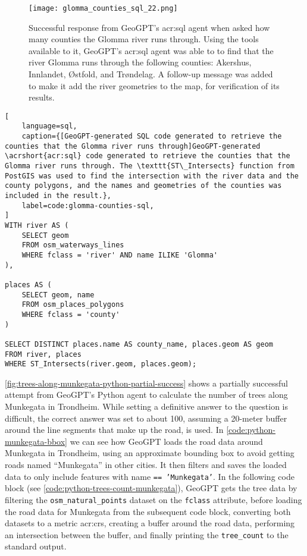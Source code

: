 \begin{figure}[htbp]
    \centering
    \texttt{[image: glomma\_counties\_sql\_22.png]}
    \caption[Successful response from GeoGPT's SQL agent when asked how many counties the Glomma river runs through]{Successful response from GeoGPT's \acrshort{acr:sql} agent when asked how many counties the Glomma river runs through. Using the tools available to it, GeoGPT's \acrshort{acr:sql} agent was able to to find that the river Glomma runs through the following counties: Akershus, Innlandet, Østfold, and Trøndelag. A follow-up message was added to make it add the river geometries to the map, for verification of its results.}
    \label{fig:glomma-counties-sql-successful}
\end{figure}

\FloatBarrier

\begin{lstlisting}[
    language=sql,
    caption={[GeoGPT-generated SQL code generated to retrieve the counties that the Glomma river runs through]GeoGPT-generated \acrshort{acr:sql} code generated to retrieve the counties that the Glomma river runs through. The \texttt{ST\_Intersects} function from PostGIS was used to find the intersection with the river data and the county polygons, and the names and geometries of the counties was included in the result.},
    label=code:glomma-counties-sql,
]
WITH river AS (
    SELECT geom 
    FROM osm_waterways_lines 
    WHERE fclass = 'river' AND name ILIKE 'Glomma'
),

places AS (
    SELECT geom, name 
    FROM osm_places_polygons 
    WHERE fclass = 'county'
)

SELECT DISTINCT places.name AS county_name, places.geom AS geom
FROM river, places
WHERE ST_Intersects(river.geom, places.geom);    
\end{lstlisting}

\FloatBarrier

\autoref{fig:trees-along-munkegata-python-partial-success} shows a partially successful attempt from GeoGPT's Python agent to calculate the number of trees along Munkegata in Trondheim. While setting a definitive answer to the question is difficult, the correct answer was set to about 100, assuming a 20-meter buffer around the line segments that make up the road, is used. In \autoref{code:python-munkegata-bbox} we can see how GeoGPT loads the road data around Munkegata in Trondheim, using an approximate bounding box to avoid getting roads named \enquote{Munkegata} in other cities. It then filters and saves the loaded data to only include features with name \texttt{== 'Munkegata'}. In the following code block (see \autoref{code:python-trees-count-munkegata}), GeoGPT gets the tree data by filtering the \texttt{osm\_natural\_points} dataset on the \texttt{fclass} attribute, before loading the road data for Munkegata from the subsequent code block, converting both datasets to a metric \acrshort{acr:crs}, creating a buffer around the road data, performing an intersection between the buffer, and finally printing the \texttt{tree\_count} to the standard output.

